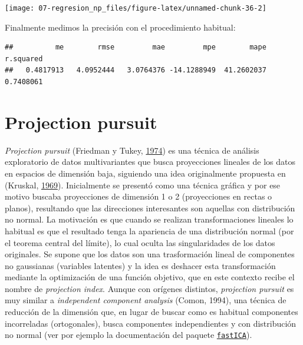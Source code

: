 \documentclass[
  spanish,
]{book}
\newenvironment{Shaded}{\begin{snugshade}}{\end{snugshade}}
\newcommand{\DataTypeTok}[1]{\textcolor[rgb]{0.13,0.29,0.53}{#1}}
\newcommand{\KeywordTok}[1]{\textcolor[rgb]{0.13,0.29,0.53}{\textbf{#1}}}
\newcommand{\NormalTok}[1]{#1}
\newcommand{\OperatorTok}[1]{\textcolor[rgb]{0.81,0.36,0.00}{\textbf{#1}}}
\newcommand{\StringTok}[1]{\textcolor[rgb]{0.31,0.60,0.02}{#1}}
\theoremstyle{break}
\theoremstyle{definition}
\theoremstyle{definition}
\theoremstyle{definition}
\theoremstyle{remark}
\begin{document}
\begin{center}\texttt{[image: 07-regresion\_np\_files/figure-latex/unnamed-chunk-36-2]} \end{center}

Finalmente medimos la precisión con el procedimiento habitual:

\begin{Shaded}
\end{Shaded}

\begin{verbatim}
##          me        rmse         mae         mpe        mape   r.squared 
##   0.4817913   4.0952444   3.0764376 -14.1288949  41.2602037   0.7408061
\end{verbatim}

\hypertarget{projection-pursuit}{%
\section{Projection pursuit}\label{projection-pursuit}}

\emph{Projection pursuit} (Friedman y Tukey, \protect\hyperlink{ref-friedman1974projection}{1974}) es una técnica de análisis exploratorio de datos multivariantes que busca proyecciones lineales de los datos en espacios de dimensión baja, siguiendo una idea originalmente propuesta en (Kruskal, \protect\hyperlink{ref-kruskal1969toward}{1969}).
Inicialmente se presentó como una técnica gráfica y por ese motivo buscaba proyecciones de dimensión 1 o 2 (proyecciones en rectas o planos), resultando que las direcciones interesantes son aquellas con distribución no normal.
La motivación es que cuando se realizan transformaciones lineales lo habitual es que el resultado tenga la apariencia de una distribución normal (por el teorema central del límite), lo cual oculta las singularidades de los datos originales.
Se supone que los datos son una trasformación lineal de componentes no gaussianas (variables latentes) y la idea es deshacer esta transformación mediante la optimización de una función objetivo, que en este contexto recibe el nombre de \emph{projection index}.
Aunque con orígenes distintos, \emph{projection pursuit} es muy similar a \emph{independent component analysis} (Comon, 1994), una técnica de reducción de la dimensión que, en lugar de buscar como es habitual componentes incorreladas (ortogonales), busca componentes independientes y con distribución no normal (ver por ejemplo la documentación del paquete \href{https://CRAN.R-project.org/package=fastICA}{\texttt{fastICA}}).
\end{document}
